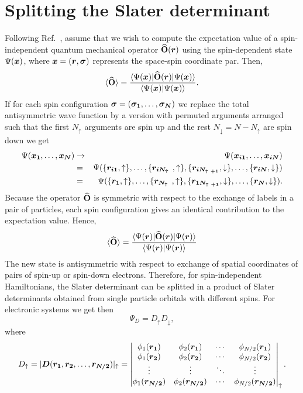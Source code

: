 \section{Splitting the Slater determinant}
Following Ref.~\cite{Foulkes}, assume that we wish to compute the expectation value of a spin-independent quantum mechanical operator ${\bf\widehat{O}}(\boldsymbol{r})$ using the spin-dependent state $\Psi(\boldsymbol{x})$, where $\boldsymbol{x} = (\boldsymbol{r}, \boldsymbol{\sigma})$ represents the space-spin coordinate par. Then,
$$
\langle{{\bf\widehat{O}}\rangle} = \frac{\langle\Psi(\boldsymbol{x})|{\bf\widehat{O}}(\boldsymbol{r})|\Psi(\boldsymbol{x})\rangle}{\langle\Psi(\boldsymbol{x})|\Psi(\boldsymbol{x})\rangle}.
$$
If for each spin configuration $\boldsymbol{\sigma} = (\boldsymbol{\sigma_1}, \ldots, \boldsymbol{\sigma_N})$ we replace the total antisymmetric wave function by a version with permuted arguments arranged such that the first $N_{\uparrow}$ arguments are spin up and the rest $N_{\downarrow} = N - N_{\uparrow}$ are spin down we get
\begin{eqnarray*}
 \Psi(\boldsymbol{x_1},\ldots,\boldsymbol{x_N}) & \rightarrow & \Psi(\boldsymbol{x_{i1}},\ldots,\boldsymbol{x_{iN}})\\
				  &    =        & \Psi(\{\boldsymbol{r_{i1}},\uparrow\},\ldots,\{\boldsymbol{r_{iN_{\uparrow}}}, \uparrow\},              		\{\boldsymbol{r_{iN_{\uparrow\!+1}}},\downarrow\},\ldots,\{\boldsymbol{r_{iN}}, \downarrow\})\\
				  &    =        & \Psi(\{\boldsymbol{r_{1}},\uparrow\},\ldots,\{\boldsymbol{r_{N_{\uparrow}}}, \uparrow\},              		\{\boldsymbol{r_{1N_{\uparrow\!+ 1}}},\downarrow\},\ldots,\{\boldsymbol{r_{N}}, \downarrow\}).
\end{eqnarray*}
Because the operator ${\bf\widehat{O}}$ is symmetric with respect to the exchange of labels in a pair of particles, each spin configuration gives an identical contribution to the expectation value. Hence, 
$$
\langle{{\bf\widehat{O}}\rangle} = \frac{\langle\Psi(\boldsymbol{r})|{\bf\widehat{O}}(\boldsymbol{r})|\Psi(\boldsymbol{r})\rangle}{\langle\Psi(\boldsymbol{r})|\Psi(\boldsymbol{r})\rangle}
$$
The new state is antisymmetric with respect to exchange of spatial coordinates of pairs of spin-up or spin-down electrons. Therefore, for spin-independent Hamiltonians, the Slater determinant can be splitted in a product of Slater determinants obtained from single particle orbitals with different spins. For electronic systems we get then
$$
\Psi_D = D_\uparrow D_\downarrow,
$$
where 
\begin{equation}
D_\uparrow = |\boldsymbol{D}(\boldsymbol{r_1}, \boldsymbol{r_2},\ldots,\boldsymbol{r_{N/2}})|_{\uparrow} = 
 \begin{vmatrix}
 \phi_1(\boldsymbol{r_1}) & \phi_2(\boldsymbol{r_1}) & \cdots & \phi_{N/2}(\boldsymbol{r_1})\\
\phi_1(\boldsymbol{r_2}) & \phi_2(\boldsymbol{r_2}) & \cdots & \phi_{N/2}(\boldsymbol{r_2})\\
\vdots  & \vdots & \ddots & \vdots  \\
\phi_1(\boldsymbol{r_{N/2}}) & \phi_2(\boldsymbol{r_{N/2}}) & \cdots & \phi_{N/2}(\boldsymbol{r_{N/2}})  
 \end{vmatrix}_{\uparrow}.
\end{equation}
